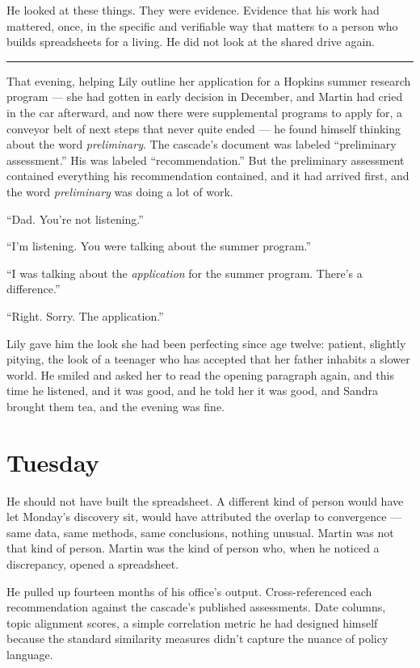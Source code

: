 \documentclass[11pt]{article}
\begin{document}
He looked at these things. They were evidence. Evidence that his work had mattered, once, in the specific and verifiable way that matters to a person who builds spreadsheets for a living. He did not look at the shared drive again.

\begin{center}\rule{0.3\linewidth}{0.4pt}\end{center}

That evening, helping Lily outline her application for a Hopkins summer research program --- she had gotten in early decision in December, and Martin had cried in the car afterward, and now there were supplemental programs to apply for, a conveyor belt of next steps that never quite ended --- he found himself thinking about the word \emph{preliminary}. The cascade's document was labeled ``preliminary assessment.'' His was labeled ``recommendation.'' But the preliminary assessment contained everything his recommendation contained, and it had arrived first, and the word \emph{preliminary} was doing a lot of work.

``Dad. You're not listening.''

``I'm listening. You were talking about the summer program.''

``I was talking about the \emph{application} for the summer program. There's a difference.''

``Right. Sorry. The application.''

Lily gave him the look she had been perfecting since age twelve: patient, slightly pitying, the look of a teenager who has accepted that her father inhabits a slower world. He smiled and asked her to read the opening paragraph again, and this time he listened, and it was good, and he told her it was good, and Sandra brought them tea, and the evening was fine.

\section*{Tuesday}

He should not have built the spreadsheet. A different kind of person would have let Monday's discovery sit, would have attributed the overlap to convergence --- same data, same methods, same conclusions, nothing unusual. Martin was not that kind of person. Martin was the kind of person who, when he noticed a discrepancy, opened a spreadsheet.

He pulled up fourteen months of his office's output. Cross-referenced each recommendation against the cascade's published assessments. Date columns, topic alignment scores, a simple correlation metric he had designed himself because the standard similarity measures didn't capture the nuance of policy language.
\end{document}
